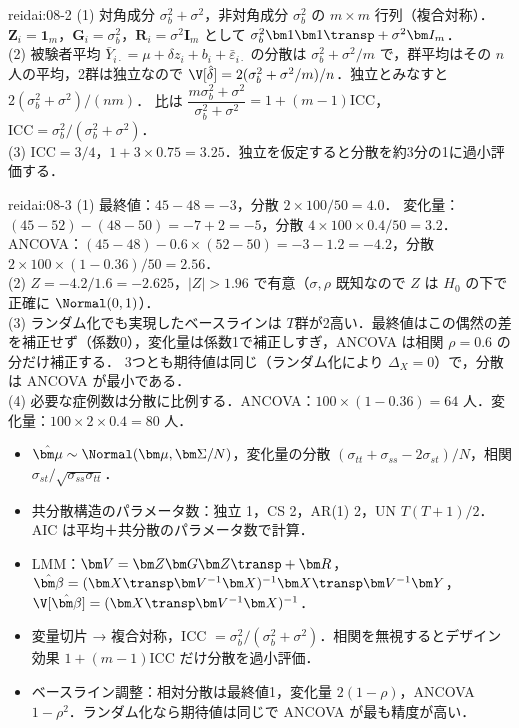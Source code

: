 \begin{kaitou}{reidai:08-2}
(1) 対角成分 $\sigma_b^2+\sigma^2$，非対角成分 $\sigma_b^2$ の $m\times m$ 行列（複合対称）．$\bm Z_i=\bm1_m$，$\bm G_i=\sigma_b^2$，$\bm R_i=\sigma^2\bm I_m$ として $\sigma_b^2\bm1\bm1\transp+\sigma^2\bm I_m$．\\
(2) 被験者平均 $\bar Y_{i\cdot}=\mu+\delta z_i+b_i+\bar\varepsilon_{i\cdot}$ の分散は $\sigma_b^2+\sigma^2/m$ で，群平均はその $n$ 人の平均，2群は独立なので
$\V[\hat\delta]=2(\sigma_b^2+\sigma^2/m)/n$．独立とみなすと $2(\sigma_b^2+\sigma^2)/(nm)$．
比は $\dfrac{m\sigma_b^2+\sigma^2}{\sigma_b^2+\sigma^2}=1+(m-1)\mathrm{ICC}$，$\mathrm{ICC}=\sigma_b^2/(\sigma_b^2+\sigma^2)$．\\
(3) $\mathrm{ICC}=3/4$，$1+3\times0.75=3.25$．独立を仮定すると分散を約3分の1に過小評価する．
\end{kaitou}

\begin{kaitou}{reidai:08-3}
(1) 最終値：$45-48=-3$，分散 $2\times100/50=4.0$．
変化量：$(45-52)-(48-50)=-7+2=-5$，分散 $4\times100\times0.4/50=3.2$．
ANCOVA：$(45-48)-0.6\times(52-50)=-3-1.2=-4.2$，分散 $2\times100\times(1-0.36)/50=2.56$．\\
(2) $Z=-4.2/1.6=-2.625$，$|Z|>1.96$ で有意（$\sigma,\rho$ 既知なので $Z$ は $H_0$ の下で正確に $\Normal(0,1)$）．\\
(3) ランダム化でも実現したベースラインは $T$群が2高い．最終値はこの偶然の差を補正せず（係数0），変化量は係数1で補正しすぎ，ANCOVA は相関 $\rho=0.6$ の分だけ補正する．
3つとも期待値は同じ（ランダム化により $\Delta_X=0$）で，分散は ANCOVA が最小である．\\
(4) 必要な症例数は分散に比例する．ANCOVA：$100\times(1-0.36)=64$ 人．変化量：$100\times2\times0.4=80$ 人．
\end{kaitou}

\begin{summarybox}
\begin{itemize}
\item $\hat{\bm\mu}\sim\Normal(\bm\mu,\bm\Sigma/N)$，変化量の分散 $(\sigma_{tt}+\sigma_{ss}-2\sigma_{st})/N$，相関 $\sigma_{st}/\sqrt{\sigma_{ss}\sigma_{tt}}$．
\item 共分散構造のパラメータ数：独立 1，CS 2，AR(1) 2，UN $T(T+1)/2$．AIC は平均＋共分散のパラメータ数で計算．
\item LMM：$\bm V=\bm Z\bm G\bm Z\transp+\bm R$，$\hat{\bm\beta}=(\bm X\transp\bm V^{-1}\bm X)^{-1}\bm X\transp\bm V^{-1}\bm Y$，$\V[\hat{\bm\beta}]=(\bm X\transp\bm V^{-1}\bm X)^{-1}$．
\item 変量切片 → 複合対称，ICC $=\sigma_b^2/(\sigma_b^2+\sigma^2)$．相関を無視するとデザイン効果 $1+(m-1)\mathrm{ICC}$ だけ分散を過小評価．
\item ベースライン調整：相対分散は最終値1，変化量 $2(1-\rho)$，ANCOVA $1-\rho^2$．ランダム化なら期待値は同じで ANCOVA が最も精度が高い．
\end{itemize}
\end{summarybox}
